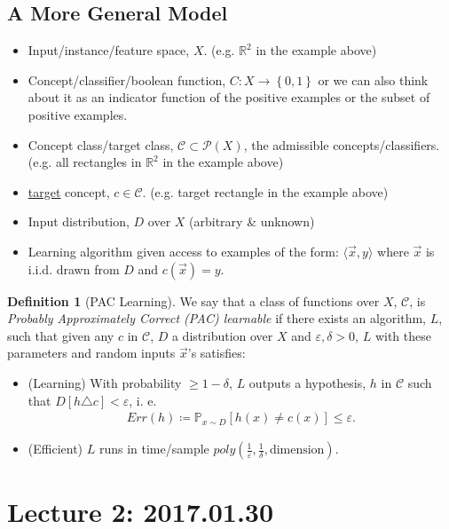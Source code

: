 \documentclass[12pt, letterpaper]{article}
\numberwithin{equation}{section} %
\newcommand{\R}{\mathbb{R}}
\newcommand{\ul}{\underline}
\newcommand{\mb}{\mathbb}
\newcommand{\mc}{\mathcal}
\newcommand{\ve}{\varepsilon}
\theoremstyle{definition}
\newtheorem{definition}[theorem]{Definition}
\theoremstyle{remark}
\begin{document}
\subsection{A More General Model}

\begin{itemize}
	\item Input/instance/feature space, $X$. (e.g. $\R^2$ in the example above)
	\item Concept/classifier/boolean function, $C: X \rightarrow \left\{0,1\right\}$ or we can also think about it as an indicator function of the positive examples or the subset of positive examples.
	\item Concept class/target class, $\mc C \subset \mc P(X)$, the admissible concepts/classifiers. (e.g. all rectangles in $\R^2$ in the example above)
	\item \ul{target} concept, $c\in\mc C$. (e.g. target rectangle in the example above)
	\item Input distribution, $D$ over $X$ (arbitrary \& unknown)
	\item Learning algorithm given access to examples of the form: $\langle \vec x,y \rangle$ where $\vec x$ is i.i.d. drawn from $D$ and $c(\vec x) = y$.
\end{itemize}

\begin{definition}[PAC Learning]
	We say that a class of functions over $X$, $\mc C$, is \emph{Probably Approximately Correct (PAC) learnable} if there exists an algorithm, $L$, such that given any $c$ in $\mc C$, $D$ a distribution over $X$ and $\ve, \delta >0$, $L$ with these parameters and random inputs $\vec x$'s satisfies:
	\begin{itemize}
		\item (Learning) With probability $\geq 1 -\delta$, $L$ outputs a hypothesis, $h$ in $\mc
		C$ such that $D[h\triangle c]<\ve$, i. e.
		\begin{align}
    		Err(h) \coloneqq \mb P_{x\sim D}[h(x) \ne c(x)] \leq \ve.
		\end{align}
		\item (Efficient) $L$ runs in time/sample $poly\left(\frac1\ve, \frac1\delta, \textrm{dimension}\right)$.
	\end{itemize}
\end{definition}


\section{Lecture 2: 2017.01.30}
\end{document}
